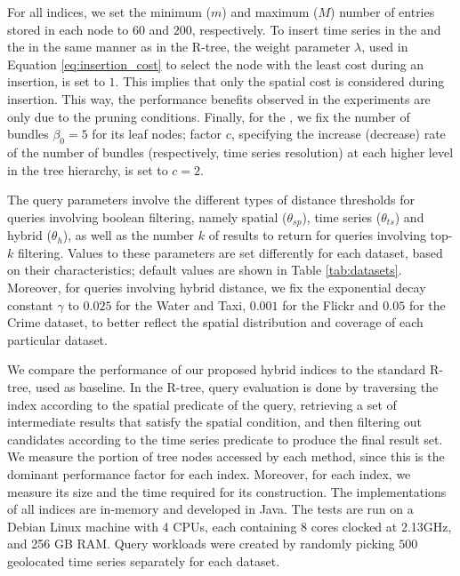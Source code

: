 For all indices, we set the minimum ($m$) and maximum ($M$) number of entries stored in each node to $60$ and $200$, respectively. To insert time series in the \tsr and the \ctsr in the same manner as in the R-tree, the weight parameter $\lambda$, used in Equation \ref{eq:insertion_cost} to select the node with the least cost during an insertion, is set to $1$. This implies that only the spatial cost is considered during insertion. This way, the performance benefits observed in the experiments are only due to the pruning conditions. Finally, for the \ctsr, we fix the number of bundles $\beta_0 = 5$ for its leaf nodes; factor $c$, specifying the increase (decrease) rate of the number of bundles (respectively, time series resolution) at each higher level in the tree hierarchy, is set to $c=2$.



The query parameters involve the different types of distance thresholds for queries involving boolean filtering, namely spatial ($\theta_{sp}$), time series ($\theta_{ts}$) and hybrid ($\theta_h$), as well as the number $k$ of results to return for queries involving top-$k$ filtering. Values to these parameters are set differently for each dataset, based on their characteristics; default values are shown in Table \ref{tab:datasets}. Moreover, for queries involving hybrid distance, we fix the exponential decay constant $\gamma$ to $0.025$ for the Water and Taxi, $0.001$ for the Flickr and $0.05$ for the Crime dataset, to better reflect the spatial distribution and coverage of each particular dataset.



We compare the performance of our proposed hybrid indices to the standard R-tree, used as baseline. In the R-tree, query evaluation is done by traversing the index according to the spatial predicate of the query, retrieving a set of intermediate results that satisfy the spatial condition, and then filtering out candidates according to the time series predicate to produce the final result set. We measure the portion of tree nodes accessed by each method, since this is the dominant performance factor for each index. Moreover, for each index, we measure its size and the time required for its construction. The implementations of all indices are in-memory and developed in Java. The tests are run on a Debian Linux machine with 4 CPUs, each containing 8 cores clocked at 2.13GHz, and 256 GB RAM. Query workloads were created by randomly picking $500$ geolocated time series separately for each dataset.



